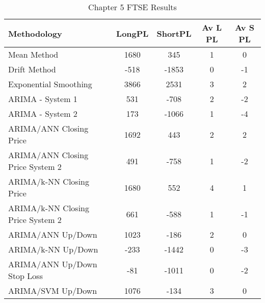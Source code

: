 \begin{table}[ht]
\centering
\caption[Chapter 5 FTSE Results]{Chapter 5 FTSE Results} 
\label{tab:chp6:ftse2_summary}
\begin{tabular}{lcccc}
  \toprule Methodology & LongPL & ShortPL & Av L PL & Av S PL \\ 
  \midrule Mean Method & 1680 & 345 & 1 & 0 \\ 
  Drift Method & -518 & -1853 & 0 & -1 \\ 
  Exponential Smoothing & 3866 & 2531 & 3 & 2 \\ 
  ARIMA - System 1 & 531 & -708 & 2 & -2 \\ 
  ARIMA - System 2 & 173 & -1066 & 1 & -4 \\ 
  ARIMA/ANN Closing Price & 1692 & 443 & 2 & 2 \\ 
  ARIMA/ANN Closing Price System 2 & 491 & -758 & 1 & -2 \\ 
  ARIMA/k-NN Closing Price & 1680 & 552 & 4 & 1 \\ 
  ARIMA/k-NN Closing Price System 2 & 661 & -588 & 1 & -1 \\ 
  ARIMA/ANN Up/Down & 1023 & -186 & 2 & 0 \\ 
  ARIMA/k-NN Up/Down & -233 & -1442 & 0 & -3 \\ 
  ARIMA/ANN Up/Down Stop Loss & -81 & -1011 & 0 & -2 \\ 
  ARIMA/SVM Up/Down & 1076 & -134 & 3 & 0 \\ 
   \bottomrule \end{tabular}
\end{table}
